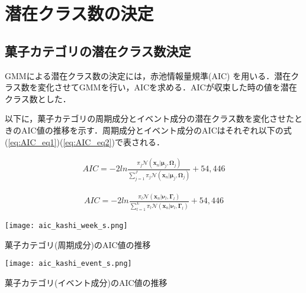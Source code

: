 \appendix

\chapter{潜在クラス数の決定}

\section{菓子カテゴリの潜在クラス数決定}
GMMによる潜在クラス数の決定には，赤池情報量規準(AIC) \cite{AIC} を用いる．潜在クラス数を変化させてGMMを行い，AICを求める．AICが収束した時の値を潜在クラス数とした．\par
以下に，菓子カテゴリの周期成分とイベント成分の潜在クラス数を変化させたときのAIC値の推移を示す．周期成分とイベント成分のAICはそれぞれ以下の式(\ref{eq:AIC_eq1})(\ref{eq:AIC_eq2})で表される．

\begin{eqnarray}
\label{eq:AIC_eq1}
 AIC = - 2 ln\frac{\pi_{j} \mathcal{N}({\bm x}_n|{\bm \mu}_{j},{\bm \Omega}_{j})}{\sum^{J}_{j=1}\pi_{j} \mathcal{N}({\bm x}_n|{\bm \mu}_{j},{\bm \Omega}_{j})} + 54,446
\end{eqnarray}

\begin{eqnarray}
\label{eq:AIC_eq2}
 AIC = - 2 ln\frac{\pi_{l} \mathcal{N}({\bm x}_n|{\bm \nu}_{l},{\bm \Gamma}_{l})}{\sum^{L}_{l=1}\pi_{l} \mathcal{N}({\bm x}_n|{\bm \nu}_{l},{\bm \Gamma}_{l})} + 54,446
\end{eqnarray}

\begin{center}
\begin{figurehere}
\texttt{[image: aic\_kashi\_week\_s.png]}
\caption{菓子カテゴリ(周期成分)のAIC値の推移}
\label{fig: aic_kashi_week}
\end{figurehere}
\end{center}
\begin{center}
\begin{figurehere}
\texttt{[image: aic\_kashi\_event\_s.png]}
\caption{菓子カテゴリ(イベント成分)のAIC値の推移}
\label{fig: aic_kashi_event}
\end{figurehere}
\end{center}\par

